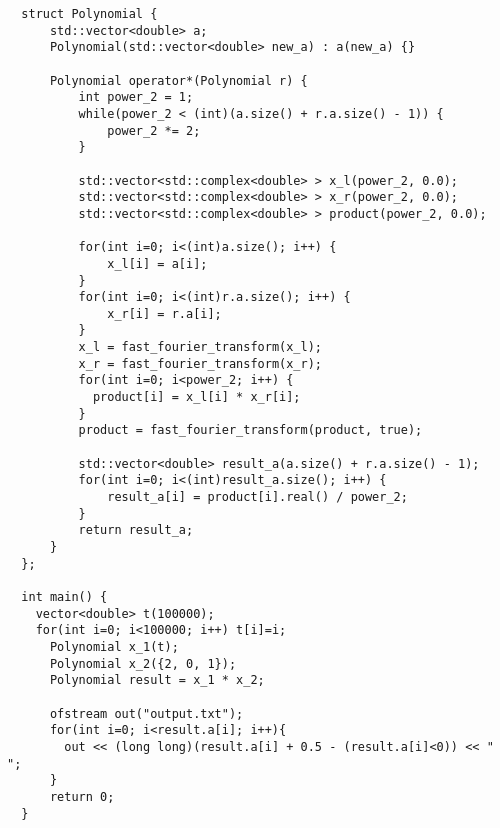 \documentclass{article}
\begin{document}
\begin{lstlisting}
  struct Polynomial {
      std::vector<double> a;
      Polynomial(std::vector<double> new_a) : a(new_a) {}

      Polynomial operator*(Polynomial r) {
          int power_2 = 1;
          while(power_2 < (int)(a.size() + r.a.size() - 1)) {
              power_2 *= 2;
          }

          std::vector<std::complex<double> > x_l(power_2, 0.0);
          std::vector<std::complex<double> > x_r(power_2, 0.0);
          std::vector<std::complex<double> > product(power_2, 0.0);

          for(int i=0; i<(int)a.size(); i++) {
              x_l[i] = a[i];
          }
          for(int i=0; i<(int)r.a.size(); i++) {
              x_r[i] = r.a[i];
          }
          x_l = fast_fourier_transform(x_l);
          x_r = fast_fourier_transform(x_r);
          for(int i=0; i<power_2; i++) {
            product[i] = x_l[i] * x_r[i];
          }
          product = fast_fourier_transform(product, true);

          std::vector<double> result_a(a.size() + r.a.size() - 1);
          for(int i=0; i<(int)result_a.size(); i++) {
              result_a[i] = product[i].real() / power_2;
          }
          return result_a;
      }
  };

  int main() {
    vector<double> t(100000);
    for(int i=0; i<100000; i++) t[i]=i;
      Polynomial x_1(t);
      Polynomial x_2({2, 0, 1});
      Polynomial result = x_1 * x_2;

      ofstream out("output.txt");
      for(int i=0; i<result.a[i]; i++){
        out << (long long)(result.a[i] + 0.5 - (result.a[i]<0)) << " ";
      }
      return 0;
  }
\end{lstlisting}
\end{document}
